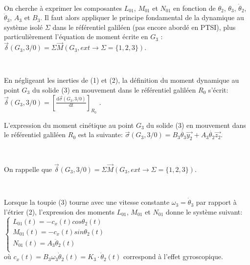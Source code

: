 ~\

On cherche à exprimer les composantes $L_{01}$,  $M_{01}$ et  $N_{01}$ en fonction de $\theta_2$, $\theta_3$, $\dot{\theta}_2$, $\dot{\theta}_3$, $A_3$ et $B_3$. Il faut alors appliquer le principe fondamental de la dynamique au système isolé $\Sigma$ dans le référentiel galiléen (pas encore abordé en PTSI), plus particulièrement l'équation de moment écrite en $G_3$ :
$\overrightarrow{\delta}(G_3,3/0)=\Sigma\overrightarrow{M}(G_3, ext\rightarrow\Sigma=\{ 1,2,3 \})$.


~\

En négligeant les inerties de (1) et (2), la définition du moment dynamique au point $G_3$ du solide (3) en mouvement dans le référentiel galiléen $R_0$ s'écrit: $\overrightarrow{\delta}(G_3,3/0)=\left [ \frac{ \mathrm{d} \overrightarrow{\sigma}(G_3,3/0)}{ \mathrm{d} t} \right]_{R_0}$ .

L'expression du moment cinétique au point $G_3$ du solide (3) en mouvement dans le référentiel galiléen $R_0$ est la suivante:
$\overrightarrow{\sigma}(G_3,3/0)=B_3 \dot{\theta_3}\overrightarrow{y_2}+A_3\dot{\theta_2}\overrightarrow{z_2}$.


~\

On rappelle que $\overrightarrow{\delta}(G_3,3/0)=\Sigma\overrightarrow{M}(G_3, ext\rightarrow\Sigma=\{ 1,2,3 \})$.


~\

Lorsque la toupie (3) tourne avec une  vitesse constante $\omega_3=\dot{\theta}_3$ par rapport à l'étrier (2), l'expression des moments $L_{01}$, $M_{01}$ et $N_{01}$ donne le système suivant:
$\begin{cases}
 L_{01}(t)=-c_x(t)cos\theta_2(t) \\ 
 M_{01}(t)=-c_x(t)sin\theta_2(t) \\ 
 N_{01}(t)=A_3\ddot\theta_2(t) \\ 
\end{cases}$
\\ où $c_x(t)=B_3\omega_3\dot\theta_2(t)=K_3 \cdot \dot\theta_2(t)$ correspond à l'effet gyroscopique.

